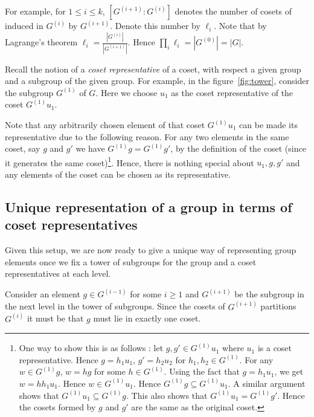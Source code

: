 For example, for $1\le i \le k$, $[G^{(i+1)}:G^{(i)}]$ denotes the number of
cosets of induced in $G^{(i)}$ by $G^{(i+1)}$. Denote this number by $\ell_i$.
Note that by Lagrange's theorem $\ell_i = \frac{|G^{(i)}|}{|G^{(i+1)}|}$.
Hence $\prod_{i} \ell_i = |G^{(0)}| = |G|$.

Recall the notion of a {\it coset representative} of a coset, with respect a
given group and a subgroup of the given group. For example, in the
figure~\ref{fig:tower}, consider the subgroup $G^{(1)}$ of $G$. Here we choose
$u_1$ as the coset representative of the coset $G^{(1)}u_1$.

Note that any arbitrarily chosen element of that coset $G^{(1)}u_1$ can be
made its representative due to the following reason. For any two elements in
the same coset, say $g$ and $g'$ we have $G^{(1)}g = G^{(1)}g'$, by the
definition of the coset (since it generates the same coset)\footnote{One way
	to show this is as follows : let $g, g' \in G^{(1)}u_1$ where $u_1$ is
	a coset representative. Hence $g = h_1u_1$, $g' = h_2u_2$ for $h_1,h_2
	\in G^{(1)}$. For any $w \in G^{(1)}g$, $w = hg$ for some 
	$h \in G^{(1)}$. Using the fact that $g = h_1u_1$, we get $w = hh_1u_1$.
	Hence $w \in G^{(1)}u_1$. Hence $G^{(1)}g \subseteq G^{(1)}u_1$. 
	A similar argument shows that $G^{(1)}u_1 \subseteq G^{(1)}g$. This
	also shows that $G^{(1)}u_1 = G^{(1)}g'$. Hence the cosets formed by
$g$ and $g'$ are the same as the original coset.}.  Hence, there is nothing
special about $u_1, g, g'$ and any elements of the coset can be chosen as its
representative.

\subsection{Unique representation of a group in terms of coset representatives}
Given this setup, we are now ready to give a unique way of representing group
elements once we fix a tower of subgroups for the group and a coset
representatives at each level.

Consider an element $g \in G^{(i-1)}$ for some $i \ge 1$ and $G^{(i+1)}$ be the
subgroup in the next level in the tower of subgroups. Since the cosets of
$G^{(i+1)}$ partitions $G^{(i)}$ it must be that $g$ must lie in exactly one
coset.


